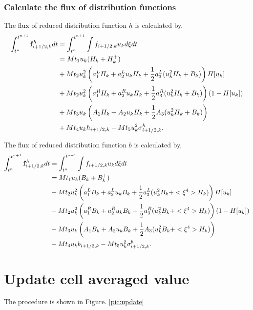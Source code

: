 \documentclass[a4paper]{book}
\begin{document}
\subsubsection*{Calculate the flux of distribution functions}
The flux of reduced distribution function $h$ is calculated by,
$$
\begin{aligned}
    \int_{t^n}^{t^{n+1}}{\bf f}_{i+1/2,k}^h dt &= \int_{t^n}^{t^{n+1}}\int f_{i+1/2,k}u_k d\xi dt\\
                        &= Mt_1 u_k (H_k+H_k^+)\\
                        &+ Mt_2 u_k^2 \left(a_1^L H_k + a_2^L u_k H_k + \frac{1}{2}a_3^L(u_k^2 H_k+B_k)\right)H[u_k]\\
                        &+ Mt_2 u_k^2 \left(a_1^R H_k + a_2^R u_k H_k + \frac{1}{2}a_3^R(u_k^2 H_k+B_k)\right)(1-H[u_k])\\
                        &+ Mt_3 u_k \left(A_1 H_k + A_2 u_k H_k + \frac{1}{2}A_3(u_k^2 H_k+B_k)\right)\\
                        &+ Mt_4 u_k h_{i+1/2,k}-Mt_5 u_k^2 \sigma_{i+1/2,k}^h.
\end{aligned} 
$$

The flux of reduced distribution function $b$ is calculated by,
$$
\begin{aligned}
    \int_{t^n}^{t^{n+1}}{\bf f}_{i+1/2,k}^h dt &= \int_{t^n}^{t^{n+1}}\int f_{i+1/2,k}u_k d\xi dt\\
                        &= Mt_1 u_k (B_k+B_k^+)\\
                        &+ Mt_2 u_k^2 \left(a_1^L B_k + a_2^L u_k B_k + \frac{1}{2}a_3^L(u_k^2 B_k+<\xi^4>H_k)\right)H[u_k]\\
                        &+ Mt_2 u_k^2 \left(a_1^R B_k + a_2^R u_k B_k + \frac{1}{2}a_3^R(u_k^2 B_k+<\xi^4>H_k)\right)(1-H[u_k])\\
                        &+ Mt_3 u_k \left(A_1 B_k + A_2 u_k B_k + \frac{1}{2}A_3(u_k^2 B_k+<\xi^4>H_k)\right)\\
                        &+ Mt_4 u_k b_{i+1/2,k}-Mt_5 u_k^2 \sigma_{i+1/2,k}^b.
\end{aligned} 
$$

\section{Update cell averaged value}
The procedure is shown in Figure. \ref{pic:update}
\end{document}
